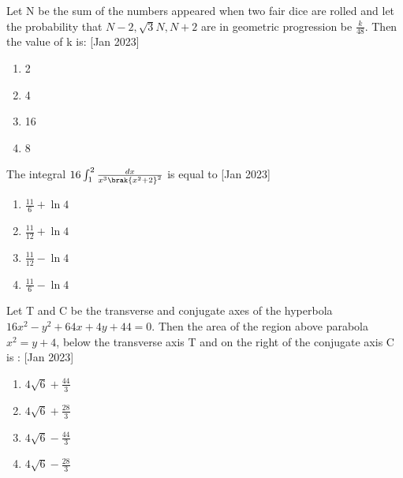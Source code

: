 \iffalse
  \title{2023}
  \author{ai24btech11005}
  \section{mcq-single}
\fi
    \item Let N be the sum of the numbers appeared when two fair dice are rolled and let the probability that $N-2,\sqrt{3}N,N+2$ are in geometric progression be $\frac{k}{48}$. Then the value of k is:
	    \hfill{[Jan 2023]}
        \begin{multicols}{1}
            \begin{enumerate}
                \item 2
                \item 4
                \item 16
                \item 8
            \end{enumerate}
        \end{multicols}

    \item The integral $16\int_{1}^{2} \frac{dx}{x^3\brak{x^2+2}^2}$ is equal  to 
 \hfill{[Jan 2023]}
		\begin{multicols}{4}
			\begin{enumerate}
				\item $\frac{11}{6}+\ln{4}$
				\item  $\frac{11}{12}+\ln{4}$
				\item  $\frac{11}{12}-\ln{4}$
				\item  $\frac{11}{6}-\ln{4}$
			\end{enumerate}
		\end{multicols}

    \item Let T and C be  the transverse and conjugate axes of the hyperbola $16x^2-y^2+64x+4y+44=0.$ Then the area of the region above parabola $x^2=y+4$, below the transverse axis T and on the right of the conjugate axis C is :
     \hfill{[Jan 2023]}
        \begin{multicols}{4}
            \begin{enumerate}
               \item $4\sqrt{6}+\frac{44}{3}$
               \item $4\sqrt{6}+\frac{28}{3}$
               \item $4\sqrt{6}-\frac{44}{3}$
               \item $4\sqrt{6}-\frac{28}{3}$
            \end{enumerate}
        \end{multicols}

